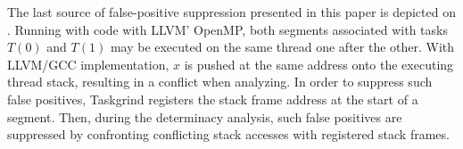 The last source of false-positive suppression presented in this paper is depicted on
.
Running with code with LLVM' OpenMP, both segments associated with tasks $T(0)$ and $T(1)$ may be executed on the same thread one after the other. With LLVM/GCC implementation, $x$ is pushed at the same address onto the executing thread stack, resulting in a conflict when analyzing.
In order to suppress such false positives, Taskgrind registers the stack frame address at the start of a segment.
Then, during the determinacy analysis, such false positives are suppressed by confronting conflicting stack accesses with registered stack frames.



